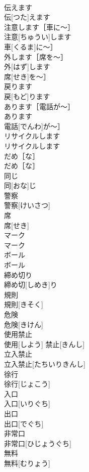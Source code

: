 \documentclass[8pt]{extreport}
\begin{document}
\begin{CJK}{UTF8}{min}
\\	伝えます	
\\	伝[つた]えます	
\\	注意します［車に〜］	
\\	注意[ちゅうい]します
\\	車[くるま]に〜］	
\\	外します［席を〜］	
\\	外[はず]します
\\	席[せき]を〜］	
\\	戻ります	
\\	戻[もど]ります	
\\	あります［電話が〜］	
\\	あります
\\	電話[でんわ]が〜］	
\\	リサイクルします	
\\	リサイクルします	
\\	だめ［な］	
\\	だめ［な］	
\\	同じ	
\\	同[おな]じ	
\\	警察	
\\	警察[けいさつ]	
\\	席	
\\	席[せき]	
\\	マーク	
\\	マーク	
\\	ボール	
\\	ボール	
\\	締め切り	
\\	締め切[しめき]り	
\\	規則	
\\	規則[きそく]	
\\	危険	
\\	危険[きけん]	
\\	使用禁止	
\\	使用[しよう] 禁止[きんし]	
\\	立入禁止	
\\	立入禁止[たちいりきんし]	
\\	徐行	
\\	徐行[じょこう]	
\\	入口	
\\	入口[いりぐち]	
\\	出口	
\\	出口[でぐち]	
\\	非常口	
\\	非常口[ひじょうぐち]	
\\	無料	
\\	無料[むりょう]	

\end{CJK}
\end{document}
